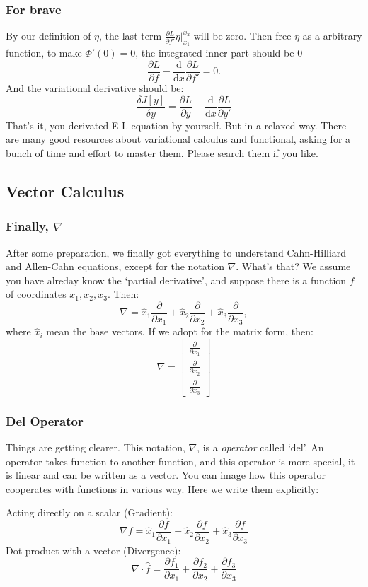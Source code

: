 \documentclass[compress]{beamer}
\begin{document}
\begin{frame}
  \frametitle{For brave}
  By our definition of \(\eta\), the last term \(\frac{\partial L}{\partial f'}\eta\Big|_{x_1}^{x_2}\) will be zero. Then free \(\eta\) as a arbitrary function, to make \(\Phi'(0) = 0\),
  the integrated inner part should be \(0\)
  \[\frac{\partial L}{\partial f}-\frac{\mathrm{d} }{\mathrm{d} x}\frac{\partial L}{\partial f'} = 0.\]
  And the variational derivative should be:
  \[
    \frac{\delta J[y]}{\delta y} = \frac{\partial L}{\partial y}-\frac{\mathrm{d} }{\mathrm{d} x}\frac{\partial L}{\partial y'}
  \]
  That's it, you derivated E-L equation by yourself. But in a relaxed way. There are many good resources about variational calculus and
  functional, asking for a bunch of time and effort to master them. Please search them if you like.
\end{frame}


\subsection{Vector Calculus}
\begin{frame}
  \frametitle{Finally, \(\nabla\)}
  After some preparation, we finally got everything to understand Cahn-Hilliard and Allen-Cahn equations, except for the
  notation \(\nabla\). What's that? We assume you have alreday know the `partial derivative', and suppose there is a function \(f\)
  of coordinates \(x_1,x_2,x_3\). Then:
  \[\nabla = \hat{x}_1 \frac{\partial }{\partial x_1} + \hat{x}_2\frac{\partial }{\partial x_2}+\hat{x}_3\frac{\partial }{\partial x_3},\]
  where \(\hat{x}_i\) mean the base vectors. If we adopt for the matrix form, then:
  \[
    \nabla =
    \begin{bmatrix}
      \frac{\partial }{\partial x_1} \\
      \frac{\partial }{\partial x_2} \\
      \frac{\partial }{\partial x_3}
    \end{bmatrix}
  \]
\end{frame}

\begin{frame}
  \frametitle{Del Operator}
  Things are getting clearer. This notation, \(\nabla\), is a \emph{operator} called `del'. An operator takes function to another function, and this
  operator is more special, it is linear and can be written as a vector. You can image how this operator cooperates with functions in various way. Here
  we write them explicitly:

  Acting directly on a scalar (Gradient):
  \[\nabla f = \hat{x}_1 \frac{\partial f}{\partial x_1} + \hat{x}_2\frac{\partial f}{\partial x_2}+\hat{x}_3\frac{\partial f}{\partial x_3}\]
  Dot product with a vector (Divergence):
  \[\nabla \cdot \hat{f} = \frac{\partial f_1}{\partial x_1} + \frac{\partial f_2}{\partial x_2}+\frac{\partial f_3}{\partial x_3}\]
\end{frame}
\end{document}
